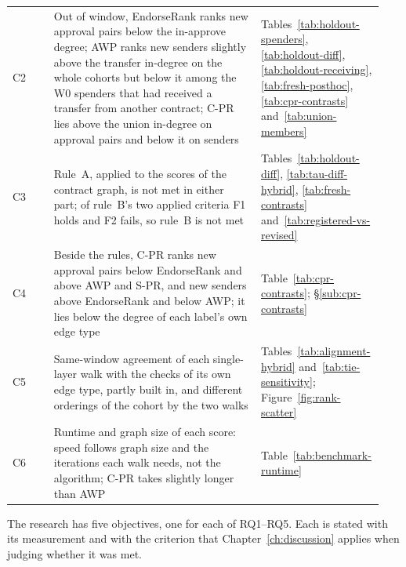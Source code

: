 \begin{table}[htbp]
{\begin{tabular}{>{\raggedright\arraybackslash}p{0.11\linewidth}>{\raggedright\arraybackslash}p{0.55\linewidth}>{\raggedright\arraybackslash}p{0.28\linewidth}}
C2 & Out of window, EndorseRank ranks new approval pairs below the in-approve degree; AWP ranks new senders slightly above the transfer in-degree on the whole cohorts but below it among the W0 spenders that had received a transfer from another contract; \mbox{C-PR} lies above the union in-degree on approval pairs and below it on senders & Tables~\ref{tab:holdout-spenders}, \ref{tab:holdout-diff}, \ref{tab:holdout-receiving}, \ref{tab:fresh-posthoc}, \ref{tab:cpr-contrasts} and~\ref{tab:union-members} \\
C3 & Rule~A, applied to the scores of the contract graph, is not met in either part; of rule~B's two applied criteria F1 holds and F2 fails, so rule~B is not met & Tables~\ref{tab:holdout-diff}, \ref{tab:tau-diff-hybrid}, \ref{tab:fresh-contrasts} and~\ref{tab:registered-vs-revised} \\
C4 & Beside the rules, \mbox{C-PR} ranks new approval pairs below EndorseRank and above AWP and \mbox{S-PR}, and new senders above EndorseRank and below AWP; it lies below the degree of each label's own edge type & Table~\ref{tab:cpr-contrasts}; \S\ref{sub:cpr-contrasts} \\
C5 & Same-window agreement of each single-layer walk with the checks of its own edge type, partly built in, and different orderings of the cohort by the two walks & Tables~\ref{tab:alignment-hybrid} and~\ref{tab:tie-sensitivity}; Figure~\ref{fig:rank-scatter} \\
C6 & Runtime and graph size of each score: speed follows graph size and the iterations each walk needs, not the algorithm; \mbox{C-PR} takes slightly longer than AWP & Table~\ref{tab:benchmark-runtime} \\
\bottomrule
\end{tabular}
}
\end{table}


The research has five objectives, one for each of RQ1--RQ5. Each is stated with its measurement and with the criterion that Chapter~\ref{ch:discussion} applies when judging whether it was met.

